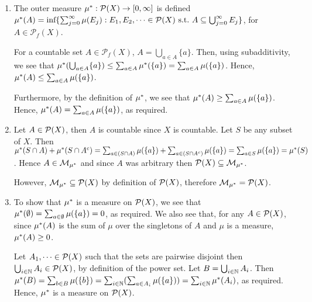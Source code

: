 \documentclass{article}
\begin{document}
\begin{flushleft}
    \begin{enumerate}[label=(\roman*)]
        \item The outer measure $\mu^\ast : \mathcal{P}(X) \rightarrow [0, \infty]$ is defined $\mu^\ast(A) = \text{inf}\{\sum_{j=0}^\infty \mu(E_j) : E_1, E_2, \dots \in \mathcal{P}(X) \, \, \text{s.t.} \, \, A \subseteq \bigcup_{j=0}^\infty E_j\}$, for $A \in \mathcal{P}_f(X)$. \newline

        For a countable set $A \in \mathcal{P}_f(X)$, $A = \bigcup_{a \in A} \{a\}$. Then, using subadditivity, we see that $\mu^\ast(\bigcup_{a \in A} \{a\}) \leq \sum_{a \in A} \mu^\ast(\{a\}) = \sum_{a \in A} \mu(\{a\})$. Hence, $\mu^\ast(A) \leq \sum_{a \in A} \mu(\{a\})$. \newline

        Furthermore, by the definition of $\mu^\ast$, we see that $\mu^\ast(A) \geq \sum_{a \in A} \mu(\{a\})$. Hence, $\mu^\ast(A) = \sum_{a \in A} \mu(\{a\})$, as required.
        

        \item Let $A \in \mathcal{P}(X)$, then $A$ is countable since $X$ is countable. Let $S$ be any subset of $X$. Then $\mu^\ast(S \cap A) + \mu^\ast(S \cap A^c) = \sum_{a \in (S \cap A)}\mu(\{a\}) + \sum_{a \in (S \cap A^c)}\mu(\{a\}) = \sum_{a \in S}\mu(\{a\}) = \mu^\ast(S)$. Hence $A \in \mathcal{M}_{\mu^\ast}$ and since $A$ was arbitrary then $\mathcal{P}(X) \subseteq \mathcal{M}_{\mu^\ast}$. \newline
        
        However, $\mathcal{M}_{\mu^\ast} \subseteq \mathcal{P}(X)$ by definition of $\mathcal{P}(X)$, therefore $\mathcal{M}_{\mu^\ast} = \mathcal{P}(X)$.
        \item To show that $\mu^\ast$ is a measure on $\mathcal{P}(X)$, we see that $\mu^\ast(\emptyset) = \sum_{a \in \emptyset}\mu(\{a\}) = 0$, as required. We also see that, for any $A \in \mathcal{P}(X)$, since $\mu^\ast(A)$ is the sum of $\mu$ over the singletons of $A$ and $\mu$ is a measure, $\mu^\ast(A) \geq 0$. \newline

        Let $A_1, \cdots \in \mathcal{P}(X)$ such that the sets are pairwise disjoint then $\bigcup_{i \in \mathbb{N}} A_i \in \mathcal{P}(X)$, by definition of the power set. Let $B = \bigcup_{i \in \mathbb{N}} A_i$. Then $\mu^\ast(B) = \sum_{b \in B}\mu(\{b\}) = \sum_{i \in \mathbb{N}}(\sum_{a \in A_i} \mu(\{a\})) = \sum_{i \in \mathbb{N}}\mu^\ast(A_i)$, as required. Hence, $\mu^\ast$ is a measure on $\mathcal{P}(X)$.
    \end{enumerate}
\end{flushleft}
\end{document}
